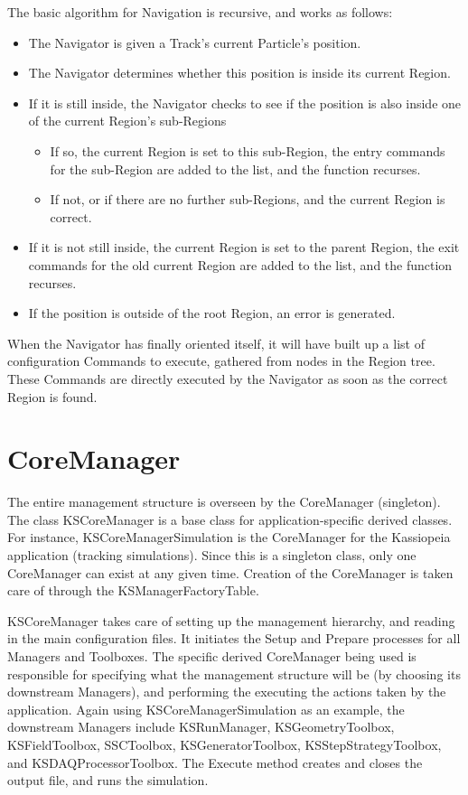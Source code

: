 The basic algorithm for Navigation is recursive, and works as follows:

\begin{itemize}
\item The Navigator is given a Track's current Particle's position.
\item The Navigator determines whether this position is inside its current Region.
\item If it is still inside, the Navigator checks to see if the position is also inside one of the current Region's sub-Regions
    \begin{itemize}
        \item If so, the current Region is set to this sub-Region, the entry commands for the sub-Region are added to the list, and the function recurses.
        \item If not, or if there are no further sub-Regions, and the current Region is correct.
    \end{itemize}
\item If it is not still inside, the current Region is set to the parent Region, the exit commands for the old current Region are added to the list, and the function recurses.
\item If the position is outside of the root Region, an error is generated.
\end{itemize}

When the Navigator has finally oriented itself, it will have built up a list of configuration Commands to execute, gathered from nodes in the Region tree.  These Commands are directly executed by the Navigator as soon as the correct Region is found.

\section{CoreManager}
The entire management structure is overseen by the CoreManager (singleton).  The class KSCoreManager is a base class for application-specific derived classes.  For instance, KSCoreManagerSimulation is the CoreManager for the Kassiopeia application (tracking simulations).  Since this is a singleton class, only one CoreManager can exist at any given time.  Creation of the CoreManager is taken care of through the KSManagerFactoryTable.
 
KSCoreManager takes care of setting up the management hierarchy, and reading in the main configuration files.  It initiates the Setup and Prepare processes for all Managers and Toolboxes.  The specific derived CoreManager being used is responsible for specifying what the management structure will be (by choosing its downstream Managers), and performing the executing the actions taken by the application.  Again using KSCoreManagerSimulation as an example, the downstream Managers include KSRunManager, KSGeometryToolbox, KSFieldToolbox, SSCToolbox, KSGeneratorToolbox, KSStepStrategyToolbox, and KSDAQProcessorToolbox.  The Execute method creates and closes the output file, and runs the simulation.
 

